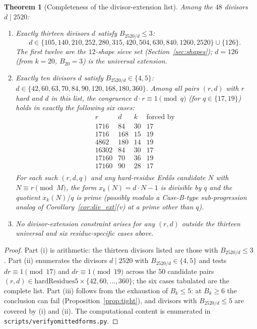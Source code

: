 \documentclass[11pt]{article}
\renewcommand{\_}{\origunderscore\allowbreak}
\newtheorem{theorem}{Theorem}[section]
\theoremstyle{definition}
\theoremstyle{remark}
\begin{document}
\begin{theorem}[Completeness of the divisor-extension list]\label{thm:complete}
Among the $48$ divisors $d\mid 2520$:
\begin{enumerate}
\item Exactly thirteen divisors $d$ satisfy $B_{2520/d}\le 3$:
\[
  d\in
  \{105,140,210,252,280,315,420,504,630,840,1260,2520\}
  \cup\{126\}.
\]
The first twelve are the $12$-shape sieve set (Section~\ref{sec:shapes});
$d=126$ (from $k=20$, $B_{20}=3$) is the universal extension.
\item Exactly ten divisors $d$ satisfy $B_{2520/d}\in\{4,5\}$:
$d\in\{42,60,63,70,84,90,120,168,180,360\}$.
Among all pairs $(r,d)$ with $r$ hard and $d$ in this list, the
congruence $d\cdot r\equiv 1\pmod q$ (for $q\in\{17,19\}$) holds
in exactly the following six cases:
\[
  \renewcommand{\arraystretch}{1.15}
  \begin{array}{l|l|l|c}
    r & d & k & \text{forced by}\\ \hline
    1716  & 84  & 30 & 17 \\
    1716  & 168 & 15 & 19 \\
    4862  & 180 & 14 & 19 \\
    16302 & 84  & 30 & 17 \\
    17160 & 70  & 36 & 19 \\
    17160 & 90  & 28 & 17 \\
  \end{array}
\]
For each such $(r,d,q)$ and any hard-residue Erd\H{o}s candidate $N$
with $N\equiv r\pmod M$, the form $x_k(N)=d\cdot N-1$ is divisible
by $q$ and the quotient $x_k(N)/q$ is prime (possibly modulo a
Case-B-type sub-progression analog of Corollary~\ref{cor:div_ext}(v)
at a prime other than $q$).
\item No divisor-extension constraint arises for any $(r,d)$ outside
the thirteen universal and six residue-specific cases above.
\end{enumerate}
\end{theorem}

\begin{proof}
Part (i) is arithmetic: the thirteen divisors listed are those with
$B_{2520/d}\le 3$. Part (ii) enumerates the divisors $d\mid 2520$
with $B_{2520/d}\in\{4,5\}$ and tests $dr\equiv 1\pmod{17}$ and
$dr\equiv 1\pmod{19}$ across the $50$ candidate pairs
$(r,d)\in\mathrm{hardResidues5}\times\{42,60,\ldots,360\}$; the six
cases tabulated are the complete list. Part (iii) follows from the
exhaustion of $B_k\le 5$: at $B_k\ge 6$ the conclusion can fail
(Proposition~\ref{prop:tight}), and divisors with $B_{2520/d}\le 5$
are covered by (i) and (ii). The computational content is
enumerated in \texttt{scripts/verify\_omitted\_forms.py}.
\end{proof}
\end{document}
